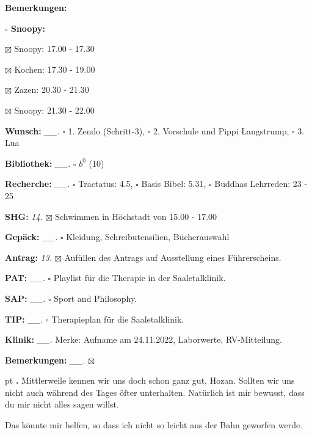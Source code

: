 \documentclass[10pt,a4paper]{article}
\newcounter{notec}
\newcommand\notep[1]{%
  \stepcounter{notec}
  \vskip #1pt
  {\bf\arabic{notec}.}
}
\newcommand\prop[1] {{\color {alizarin} {\bf #1}}}             %
\newcommand\opti[1] {{\color {amethyst} {\bf #1}}}             %
\newcommand\mand[1] {{\color {burntorange} {\bf #1}}}          %
\newcommand\bottomspace{\vskip 4pt}
\newcommand\n[1] { {\sl #1.} \hskip 5pt }
\begin{document}
\begin{mdframed}[style=daystyle]
\begin{labeling}{{\mand {Bemerkungen:}}}
\begin{minipage}{0.75\textwidth}
\begin{labeling}{\prop {$\square$ {Snoopy:}}}
      \item[$\boxtimes$ Snoopy:] 17.00 - 17.30
      \item[$\boxtimes$ Kochen:] 17.30 - 19.00
        
      \item[$\boxtimes$ Zazen:]  20.30 - 21.30
      \item[$\boxtimes$ Snoopy:] 21.30 - 22.00
      \end{labeling}
    \end{minipage}
    \bottomspace
  \item[{\mand {Wunsch:}}]       \n{\_\_} $\square$ 1. Zendo (Schritt-3),
      $\square$ 2. Vorschule und Pippi Langstrump, $\square$ 3. Lua
  \item[{\mand {Bibliothek:}}]   \n{\_\_} $\square$ $b^{0}$ (10)
  \item[{\mand {Recherche:}}]    \n{\_\_} $\square$ Tractatus: 4.5, $\square$ Basis Bibel: 5.31,
      $\square$ Buddhas Lehrreden: 23 - 25
  \item[{\mand {SHG:}}]            \n{14} $\boxtimes$ Schwimmen in Höchstadt von 15.00 - 17.00
  \item[{\mand {Gepäck:}}]       \n{\_\_} $\square$ Kleidung, Schreibutensilien, Bücherauswahl
  \item[{\opti {Antrag:}}]         \n{13} $\boxtimes$ Aufüllen des Antrags auf Ausstellung eines Führerscheins.
  \item[{\opti {PAT:}}]          \n{\_\_} $\square$ Playlist für die Therapie in der Saaletalklinik.
  \item[{\opti {SAP:}}]          \n{\_\_} $\square$ Sport and Philosophy.
  \item[{\opti {TIP:}}]          \n{\_\_} $\square$ Therapieplan für die Saaletalklinik.
  \item[{\opti {Klinik:}}]       \n{\_\_} Merke: Aufname am 24.11.2022, Laborwerte, RV-Mitteilung.
  \item[{\mand {Bemerkungen:}}]  \n{\_\_} $\boxtimes$
  \end{labeling}
    
  \setcounter{notec}{0}
  
  \notep 0 Mittlerweile kennen wir uns doch schon ganz gut, Hozan. Sollten wir
  uns nicht auch während des Tages öfter unterhalten. Natürlich ist mir bewusst,
  dass du mir nicht alles sagen willst.

  \vskip 2pt
  Das könnte mir helfen, so dass ich nicht so leicht aus der Bahn geworfen
  werde.


\end{mdframed}
\end{document}

